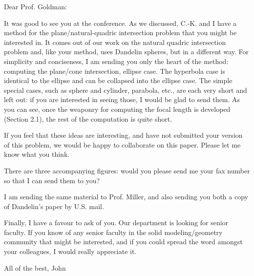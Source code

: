 Dear Prof. Goldman:

	It was good to see you at the conference.
As we discussed, C.-K. and I have a method for the plane/natural-quadric
intersection problem that you might be interested in.
It comes out of our work on the natural quadric intersection problem 
and, like your method, uses Dandelin spheres, but in a different way.
For simplicity and conciseness, I am sending you only the heart of the method: 
computing the plane/cone intersection, ellipse case.
The hyperbola case is identical
to the ellipse and can be collapsed into the ellipse case.
The simple special cases, such as sphere and cylinder, parabola, etc., 
are each very short and left out:
if you are interested in seeing those, I would be glad to send them.
As you can see, once the weaponry for computing the focal length is developed
(Section 2.1), the rest of the computation is quite short.

If you feel that these ideas are interesting, and have not submitted your 
version of this problem, we would be happy to collaborate on this paper.
Please let me know what you think.

There are three accompanying figures: 
would you please send me your fax number so that I can send them to you?

I am sending the same material to Prof. Miller, and also sending you both
a copy of Dandelin's paper by U.S. mail.

Finally, I have a favour to ask of you.   Our department is looking for senior
faculty.  If you know of any senior faculty in the solid modeling/geometry
community that might be interested, and if you could spread the word amongst
your colleagues, I would really appreciate it.

			All of the best, 	
			John
